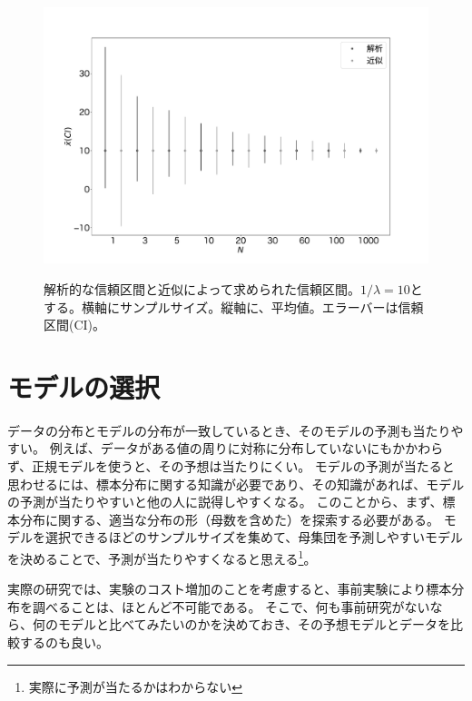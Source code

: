 \begin{figure}
 \begin{center}
  \includegraphics[width=15cm]{./image/12_/confidence_expon_interval.pdf}
  \label{fig:model_predict_CI_interval}
  \caption{解析的な信頼区間と近似によって求められた信頼区間。$1/\lambda=10$とする。横軸にサンプルサイズ。縦軸に、平均値。エラーバーは信頼区間(CI)。}
 \end{center}
\end{figure}

\section{モデルの選択}
データの分布とモデルの分布が一致しているとき、そのモデルの予測も当たりやすい。
例えば、データがある値の周りに対称に分布していないにもかかわらず、正規モデルを使うと、その予想は当たりにくい。
モデルの予測が当たると思わせるには、標本分布に関する知識が必要であり、その知識があれば、モデルの予測が当たりやすいと他の人に説得しやすくなる。
このことから、まず、標本分布に関する、適当な分布の形（母数を含めた）を探索する必要がある。
モデルを選択できるほどのサンプルサイズを集めて、母集団を予測しやすいモデルを決めることで、予測が当たりやすくなると思える\footnote{実際に予測が当たるかはわからない}。

実際の研究では、実験のコスト増加のことを考慮すると、事前実験により標本分布を調べることは、ほとんど不可能である。
そこで、何も事前研究がないなら、何のモデルと比べてみたいのかを決めておき、その予想モデルとデータを比較するのも良い。
\fi


